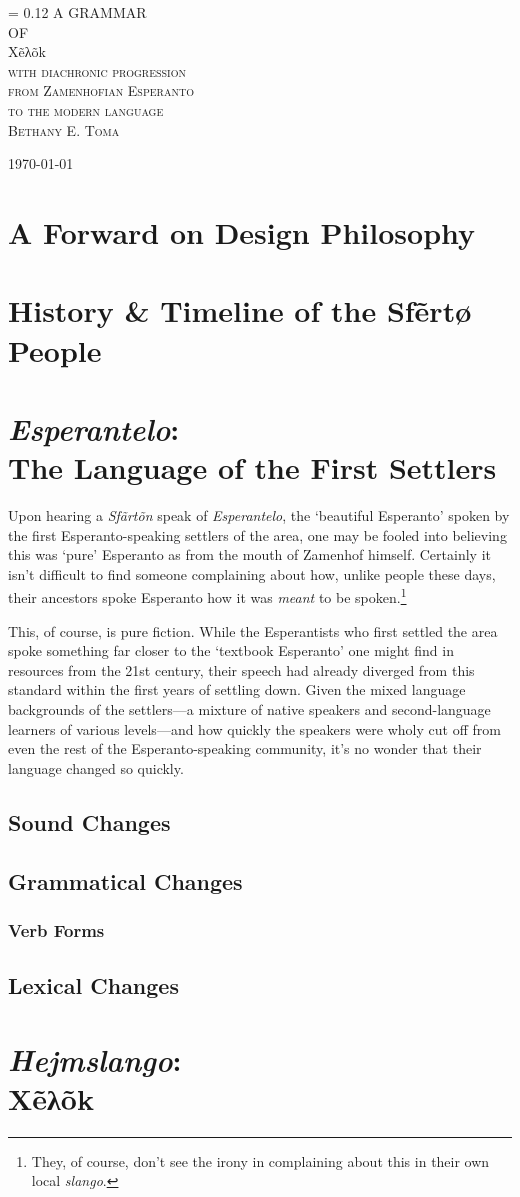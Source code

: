 \documentclass[a4paper,11pt,twoside,openany]{memoir}
\newcommand{\lam}{λ}
\newlength{\drop}%
\newcommand*{\titleAM}{\begingroup%
\drop = 0.12\textheight
\centering
\vspace*{\drop}
{\Huge A GRAMMAR}\\[\baselineskip]
{\Large OF}\\[\baselineskip]
{\Huge X\~{e}\lam \~{o}k}\\[\baselineskip]
{\scshape with diachronic progression}\\
{\scshape from Zamenhofian Esperanto}\\
{\scshape to the modern language}\\[2.5\drop]

{\small\scshape Bethany E. Toma}\par
{\small\scshape \today}\par
\vfill\null
\endgroup}
\begin{document}
\begin{titlingpage}
\titleAM
\clearpage
\end{titlingpage}
\frontmatter
\tableofcontents
\chapter{A Forward on Design Philosophy}
\chapter{History \& Timeline of the Sf\~{e}rtø People}
\mainmatter
\chapter[\textit{Esperantelo}: The Language of the First Settlers]{\textit{Esperantelo}:\\The Language of the First Settlers}

Upon hearing a \textit{Sf\~{a}rt\~{o}n} speak of \textit{Esperantelo}, the `beautiful Esperanto' spoken by the first Esperanto-speaking settlers of the area, one may be fooled into believing this was `pure' Esperanto as from the mouth of Zamenhof himself. Certainly it isn't difficult to find someone complaining about how, unlike people these days, their ancestors spoke Esperanto how it was \emph{meant} to be spoken.\footnote{They, of course, don't see the irony in complaining about this in their own local \textit{slango}.}

This, of course, is pure fiction. While the Esperantists who first settled the area spoke something far closer to the `textbook Esperanto' one might find in resources from the 21st century, their speech had already diverged from this standard within the first years of settling down. Given the mixed language backgrounds of the settlers---a mixture of native speakers and second-language learners of various levels---and how quickly the speakers were wholy cut off from even the rest of the Esperanto-speaking community, it's no wonder that their language changed so quickly.



\section{Sound Changes}

\section{Grammatical Changes}

\subsection{Verb Forms}

\section{Lexical Changes}

\chapter[\textit{Hejmslango}: X\~{e}\lam\~{o}k]{\textit{Hejmslango}:\\X\~{e}\lam\~{o}k}
\end{document}
